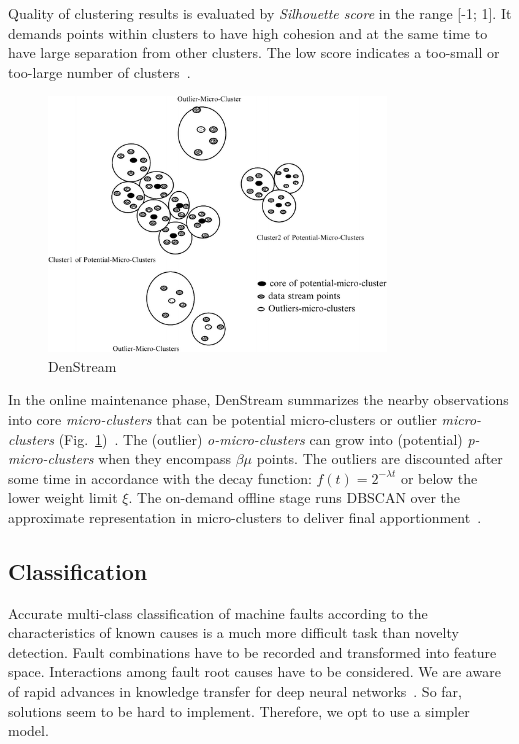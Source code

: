 Quality of clustering results is evaluated by \emph{Silhouette score} in the range [-1; 1]. It demands points within clusters to have high cohesion and at the same time to have large separation from other clusters. The low score indicates a too-small or too-large number of clusters~\cite{rousseeuw_rousseeuw_1987}.

\begin{figure}[ht]
    \centering
    \includegraphics[width=0.8\textwidth]{assets/analysis/DenStream.png}
    \caption{DenStream~\cite{amini_density_2012}}
    \label{fig:denstream}
\end{figure}

In the online maintenance phase, DenStream summarizes the nearby observations into core \emph{micro-clusters} that can be potential micro-clusters or outlier \emph{micro-clusters} (Fig.~\ref{fig:denstream})~\cite{ghesmoune_state---art_2016}. The (outlier) \emph{o-micro-clusters} can grow into (potential) \emph{p-micro-clusters} when they encompass $\beta \mu$ points. The outliers are discounted after some time in accordance with the decay function: $f(t) = 2^{-\lambda t}$ or below the lower weight limit $\xi$. The on-demand offline stage runs DBSCAN over the approximate representation in micro-clusters to deliver final apportionment~\cite{cao_density-based_2006}.

\subsection{Classification}
Accurate multi-class classification of machine faults according to the characteristics of known causes is a much more difficult task than novelty detection. Fault combinations have to be recorded and transformed into feature space. Interactions among fault root causes have to be considered. We are aware of rapid advances in knowledge transfer for deep neural networks~\cite{maurya_condition-based_2021}. So far, solutions seem to be hard to implement. Therefore, we opt to use a simpler model.

